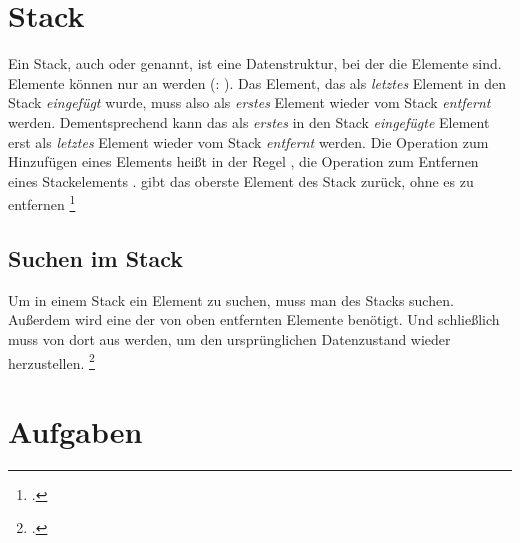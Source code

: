 \documentclass{lehramt-informatik-haupt}
\begin{document}

\chapter{Stack}

\begin{quellen}
\item \cite[Seite 275-281 (PDF 291-297)]{saake}
\item \cite{wiki:stapelspeicher}
\item \cite[Kapitel 6.2.1.4 Seite 182]{schneider}
\end{quellen}

Ein Stack, auch  oder  genannt, ist eine
Datenstruktur, bei der die Elemente 
sind. Elemente können nur an  werden (: ).
%
Das Element, das als \emph{letztes} Element in den Stack
\emph{eingefügt} wurde, muss also als \emph{erstes} Element wieder vom
Stack \emph{entfernt} werden.
%
Dementsprechend kann das als \emph{erstes} in den Stack
\emph{eingefügte} Element erst als \emph{letztes} Element wieder vom
Stack \emph{entfernt} werden.
%
Die Operation zum Hinzufügen eines Elements heißt in der Regel
, die Operation zum Entfernen eines Stackelements
.  gibt das oberste Element des Stack zurück,
ohne es zu entfernen
\footcite[Seite 19 (PDF 17)]{aud:fs:4}

%

\section{Suchen im Stack}

Um in einem Stack ein Element zu suchen, muss man  des Stacks suchen.
%
Außerdem wird eine  der
von oben entfernten Elemente benötigt.
%
Und schließlich muss von dort aus 
werden, um den ursprünglichen Datenzustand wieder herzustellen.
\footcite[Seite 20 (PDF 18)]{aud:fs:4}


\chapter{Aufgaben}

\literatur
\end{document}
